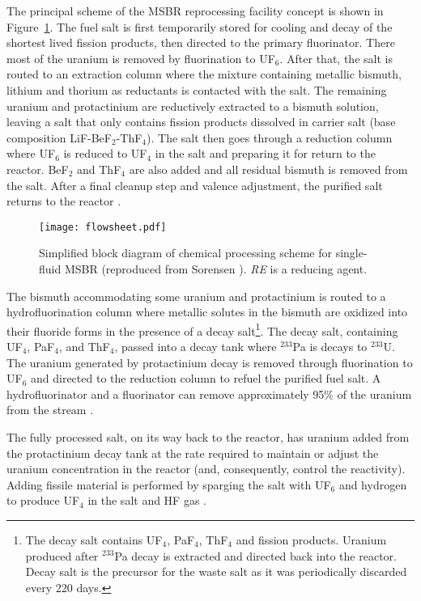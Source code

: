 The principal scheme of the \gls{MSBR} reprocessing facility concept is shown 
in Figure~\ref{fig:material_flow}. The fuel salt is first temporarily stored 
for cooling and decay of the shortest lived fission products, then directed to 
the primary fluorinator. There most of the uranium is removed by fluorination 
to UF$_6$. After that, the salt is routed to an extraction column where the 
mixture containing metallic bismuth, lithium and thorium as reductants is 
contacted with the salt. The remaining uranium and protactinium are 
reductively extracted to a bismuth solution, leaving a salt that only contains 
fission products dissolved in carrier salt (base composition 
LiF-BeF$_2$-ThF$_4$). The salt then goes through a reduction column where 
UF$_6$ is reduced to UF$_4$ in the salt and preparing it for return to the 
reactor. BeF$_2$ and ThF$_4$ are also added and all residual bismuth is 
removed from the salt. After a final cleanup step and valence adjustment, the 
purified salt returns to the reactor \cite{carter_design_1972, 
sorensen_one-fluid_2006}.
\begin{figure}[htp!] %
  \centering
  \texttt{[image: flowsheet.pdf]}
  \caption{Simplified block diagram of chemical processing scheme for 
  single-fluid \gls{MSBR} (reproduced from Sorensen 
  \cite{sorensen_one-fluid_2006}). \emph{RE} is a reducing agent.}
  \label{fig:material_flow}
\end{figure}

The bismuth accommodating some uranium and protactinium is routed to a 
hydrofluorination column where metallic solutes in the bismuth are 
oxidized into their fluoride forms in the presence of a decay 
salt\footnote{The decay salt contains UF$_4$, PaF$_4$, ThF$_4$ and fission 
products. Uranium produced after $^{233}$Pa decay is extracted and directed 
back into the reactor. Decay salt is the precursor for the waste salt as it 
was periodically discarded every 220 days.}. The decay salt, containing 
UF$_4$, PaF$_4$, and ThF$_4$, passed into a decay tank where $^{233}$Pa is 
decays to $^{233}$U. The uranium generated by protactinium decay is removed 
through fluorination to UF$_6$ and directed to the reduction column to refuel 
the purified fuel salt. A hydrofluorinator and a fluorinator can remove 
approximately 95\% of the uranium from the stream 
\cite{robertson_conceptual_1971}.

The fully processed salt, on its way back to the reactor, has uranium added 
from the protactinium decay tank at the rate required to maintain or adjust 
the uranium concentration in the reactor (and, consequently, control the 
reactivity). Adding fissile material is performed by sparging the salt with 
UF$_6$ and hydrogen to produce UF$_4$ in the salt and HF gas 
\cite{robertson_conceptual_1971}.

